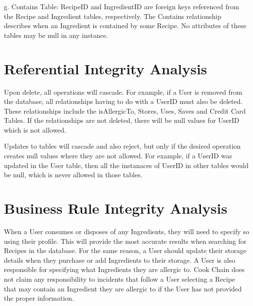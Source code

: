 \documentclass{article}
\begin{document}
g.	Contains Table: RecipeID and IngredientID are foreign keys referenced from the Recipe and Ingredient tables, respectively. The Contains relationship describes when an Ingredient is contained by some Recipe. No attributes of these tables may be null in any instance.

\section{Referential Integrity Analysis}
Upon delete, all operations will cascade. For example, if a User is removed from the database, all relationships having to do with a UserID must also be deleted. These relationships include the isAllergicTo, Stores, Uses, Saves and Credit Card Tables. If the relationships are not deleted, there will be null values for UserID which is not allowed.

Updates to tables will cascade and also reject, but only if the desired operation creates null values where they are not allowed. For example, if a UserID was updated in the User table, then all the instanaces of UserID in other tables would be null, which is never allowed in those tables.

\section{Business Rule Integrity Analysis}
	When a User consumes or disposes of any Ingredients, they will need to specify so using their profile. This will provide the most accurate results when searching for Recipes in the database. For the same reason, a User should update their storage details when they purchase or add Ingredients to their storage. A User is also responsible for specifying what Ingredients they are allergic to. Cook Chain does not claim any responsibility to incidents that follow a User selecting a Recipe that may contain an Ingredient they are allergic to if the User has not provided the proper information.
\newpage
{}
 
\begin{thebibliography}{9}
\iffalse
\bibitem{latexcompanion} 
Michel Goossens, Frank Mittelbach, and Alexander Samarin. 
\textit{The \LaTeX\ Companion}. 
Addison-Wesley, Reading, Massachusetts, 1993.
 
\bibitem{einstein} 
Albert Einstein. 
\textit{Zur Elektrodynamik bewegter K{\"o}rper}. (German) 
[\textit{On the electrodynamics of moving bodies}]. 
Annalen der Physik, 322(10):891–921, 1905.
 
\bibitem{knuthwebsite} 
Knuth: Computers and Typesetting,
\\\texttt{http://www-cs-faculty.stanford.edu/\~{}uno/abcde.html}
\fi
\end{thebibliography}
 

 
\end{document}
